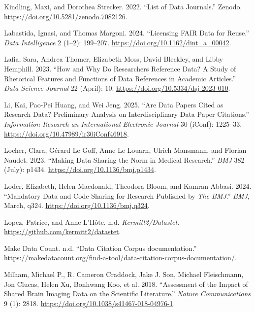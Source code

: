 \documentclass[
  letterpaper,
  DIV=11,
  numbers=noendperiod]{scrartcl}
\newlength{\cslhangindent}
\newenvironment{CSLReferences}[2] %
 {\begin{list}{}{%
  \setlength{\itemindent}{0pt}
  \setlength{\leftmargin}{0pt}
  \setlength{\parsep}{0pt}
  \ifodd #1
   \setlength{\leftmargin}{\cslhangindent}
   \setlength{\itemindent}{-1\cslhangindent}
  \fi
  \setlength{\itemsep}{#2\baselineskip}}}
 {\end{list}}
\begin{document}
\begin{CSLReferences}{1}{0}
Kindling, Maxi, and Dorothea Strecker. 2022. {``List of Data
Journals.''} Zenodo. \url{https://doi.org/10.5281/zenodo.7082126}.

Labastida, Ignasi, and Thomas Margoni. 2024. {``Licensing {FAIR Data}
for {Reuse}.''} \emph{Data Intelligence} 2 (1--2): 199--207.
\url{https://doi.org/10.1162/dint_a_00042}.

Lafia, Sara, Andrea Thomer, Elizabeth Moss, David Bleckley, and Libby
Hemphill. 2023. {``How and Why Do Researchers Reference Data? A Study of
Rhetorical Features and Functions of Data References in Academic
Articles.''} \emph{Data Science Journal} 22 (April): 10.
\url{https://doi.org/10.5334/dsj-2023-010}.

Li, Kai, Pao-Pei Huang, and Wei Jeng. 2025. {``Are Data Papers Cited as
Research Data? {Preliminary} Analysis on Interdisciplinary Data Paper
Citations.''} \emph{Information Research an International Electronic
Journal} 30 (iConf): 1225--33.
\url{https://doi.org/10.47989/ir30iConf46918}.

Locher, Clara, Gérard Le Goff, Anne Le Louarn, Ulrich Mansmann, and
Florian Naudet. 2023. {``Making Data Sharing the Norm in Medical
Research.''} \emph{BMJ} 382 (July): p1434.
\url{https://doi.org/10.1136/bmj.p1434}.

Loder, Elizabeth, Helen Macdonald, Theodora Bloom, and Kamran Abbasi.
2024. {``Mandatory Data and Code Sharing for Research Published by
{\emph{The BMJ}}.''} \emph{BMJ}, March, q324.
\url{https://doi.org/10.1136/bmj.q324}.

Lopez, Patrice, and Anne L'Hôte. n.d. \emph{Kermitt2/Datastet}.
\url{https://github.com/kermitt2/datastet}.

Make Data Count. n.d. {``{Data Citation Corpus documentation}.''}
\url{https://makedatacount.org/find-a-tool/data-citation-corpus-documentation/}.

Milham, Michael P., R. Cameron Craddock, Jake J. Son, Michael
Fleischmann, Jon Clucas, Helen Xu, Bonhwang Koo, et al. 2018.
{``Assessment of the Impact of Shared Brain Imaging Data on the
Scientific Literature.''} \emph{Nature Communications} 9 (1): 2818.
\url{https://doi.org/10.1038/s41467-018-04976-1}.


\end{CSLReferences}
\end{document}
